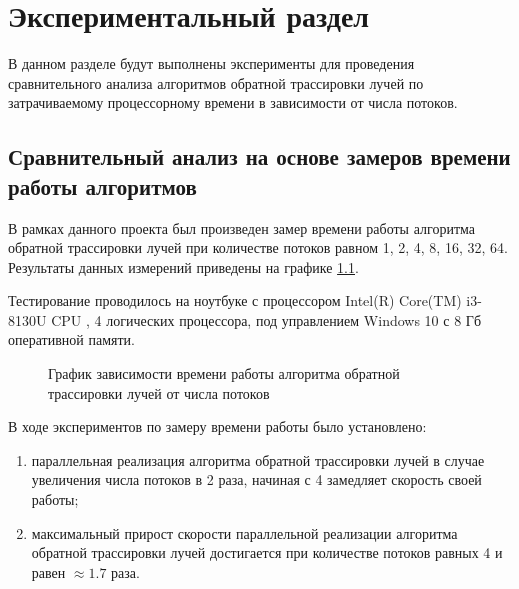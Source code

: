 \chapter{Экспериментальный раздел}
\label{cha:research}
    В данном разделе будут выполнены эксперименты для проведения 
    сравнительного анализа алгоритмов обратной трассировки лучей по затрачиваемому процессорному 
    времени в зависимости от числа потоков.

    \section{Сравнительный анализ на основе замеров времени работы алгоритмов}
	 В рамках данного проекта был произведен замер времени работы алгоритма обратной трассировки лучей при количестве потоков равном 1, 2, 4, 8, 16, 32, 64.
	Результаты данных измерений приведены на графике \ref{graph:1}.

        Тестирование проводилось на ноутбуке с процессором
        Intel(R) Core(TM) i3-8130U CPU \cite{processor-i3-8130u}, 4 логических процессора,
        под управлением Windows 10 с 8 Гб оперативной памяти.

    \begin{figure}[h!]
        \centering
        \caption{График зависимости времени работы алгоритма обратной трассировки лучей от числа потоков} 
        \label{graph:1}
    \end{figure}

        В ходе экспериментов по замеру времени работы было установлено:
	\begin{enumerate}
	\item параллельная реализация алгоритма обратной трассировки лучей в случае увеличения числа потоков в 2 раза, начиная с 4 замедляет скорость своей работы;
	\item максимальный прирост скорости параллельной реализации алгоритма обратной трассировки лучей достигается при количестве потоков равных 4 и равен  $ \approx 1.7 $ раза.

        \end{enumerate}



   
\newpage